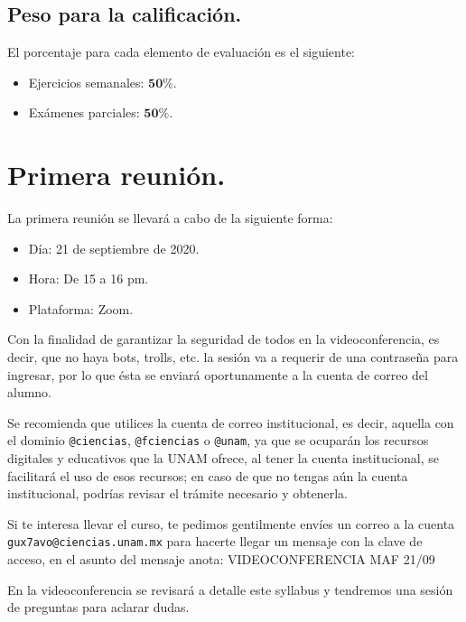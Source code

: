 \documentclass[12pt]{article}
\begin{document}
\subsection{Peso para la calificación.}

El porcentaje para cada elemento de evaluación es el siguiente:
\begin{itemize}
\setlength{\itemsep}{0mm}
\item Ejercicios semanales: $\mathbf{50\%}$.
\item Exámenes parciales: $\mathbf{50\%}$.
\end{itemize}
\section{Primera reunión.}
La primera reunión se llevará a cabo de la siguiente forma:
\begin{itemize}
\item Día: 21 de septiembre de 2020.
\item Hora: De 15 a 16 pm.
\item Plataforma: Zoom.
\end{itemize}
Con la finalidad de garantizar la seguridad de todos en la videoconferencia, es decir, que no haya bots, trolls, etc. la sesión va a requerir de una contraseña para ingresar, por lo que ésta se enviará oportunamente a la cuenta de correo del alumno.
\par
Se recomienda que utilices la cuenta de correo institucional, es decir, aquella con el dominio \texttt{@ciencias}, \texttt{@fciencias} o \texttt{@unam}, ya que se ocuparán los recursos digitales y educativos que la UNAM ofrece, al tener la cuenta institucional, se facilitará el uso de esos recursos; en caso de que no tengas aún la cuenta institucional, podrías revisar el trámite necesario y obtenerla.
\par
Si te interesa llevar el curso, te pedimos gentilmente envíes un correo a la cuenta \texttt{gux7avo@ciencias.unam.mx} para hacerte llegar un mensaje con la clave de acceso, en el asunto del mensaje anota: VIDEOCONFERENCIA MAF 21/09
\par
En la videoconferencia se revisará a detalle este syllabus y tendremos una sesión de preguntas para aclarar dudas.
\end{document}
